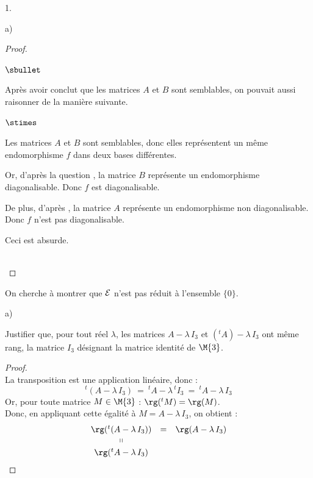\begin{noliste}{1.}
\begin{noliste}{a)}
\begin{proof}
\begin{remark}
\begin{noliste}{$\sbullet$}
	  \item Après avoir conclut que les matrices $A$ et $B$ sont 
	  semblables, on pouvait aussi raisonner de la manière 
	  suivante.
	  \begin{noliste}{$\stimes$}
	    \item Les matrices $A$ et $B$ sont semblables, donc elles 
	    représentent un même endomorphisme $f$ dans deux bases 
	    différentes.
	    \item Or, d'après la question , la matrice 
	    $B$ représente un endomorphisme diagonalisable. Donc $f$
	    est diagonalisable.
	    \item De plus, d'après , la matrice $A$ 
	    représente un endomorphisme non diagonalisable. Donc $f$
	    n'est pas diagonalisable.
	  \end{noliste}
	  Ceci est absurde.
        \end{noliste}
      \end{remark}~\\[-1.4cm]
    \end{proof}
  \end{noliste}
  
  \item On cherche à montrer que ${\cal E}$ n'est pas réduit à 
  l'ensemble $\{0\}$.
  \begin{noliste}{a)}
    \setlength{\itemsep}{2mm}
    \item Justifier que, pour tout réel $\lambda$, les matrices 
    $A-\lambda \, I_3$ et $({}^t A)- \lambda \, I_3$ ont même rang, 
    la matrice $I_3$ désignant la matrice identité de $\M{3}$.
    
    \begin{proof}~\\
      La transposition est une application linéaire, donc :
      \[
        {}^t(A- \lambda \, I_3) \ = \ {}^t A - \lambda \, {}^t I_3
        \ = \ {}^t A - \lambda \, I_3
      \]
      Or, pour toute matrice $M\in \M{3}$ : $\rg({}^t M) = \rg(M)$.\\
      Donc, en appliquant cette égalité à $M= A - \lambda \, I_3$, on 
      obtient :
      \[
       \begin{array}{ccc}
        \rg({}^t (A- \lambda \, I_3)) & = &  \rg(A- \lambda \, I_3)
        \\
        \shortparallel
        \\[.1cm]
        \rg({}^t A - \lambda \, I_3)
       \end{array}
      \]
      

\end{proof}
\end{noliste}
\end{noliste}
